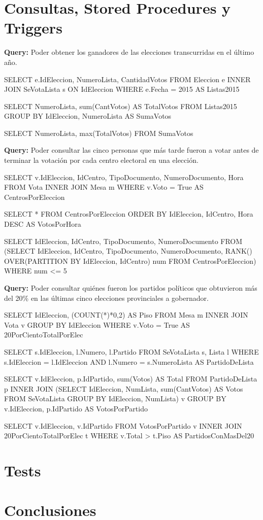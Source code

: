 \documentclass[10pt,a4paper]{article}
\begin{document}

\newpage
\section{Consultas, Stored Procedures y Triggers}

\textbf{Query:} Poder obtener los ganadores de las elecciones transcurridas en el último año.

SELECT e.IdEleccion, NumeroLista, CantidadVotos
FROM Eleccion e INNER JOIN SeVotaLista s
ON IdEleccion
WHERE e.Fecha = 2015 %
AS Listas2015

SELECT NumeroLista, sum(CantVotos) AS TotalVotos
FROM Listas2015
GROUP BY IdEleccion, NumeroLista
AS SumaVotos

SELECT NumeroLista, max(TotalVotos)
FROM SumaVotos

\textbf{Query:} Poder consultar las cinco personas que más tarde fueron a votar antes de terminar la votación por cada centro electoral en una elección.

SELECT v.IdEleccion, IdCentro, TipoDocumento, NumeroDocumento, Hora
FROM Vota INNER JOIN Mesa m
WHERE v.Voto = True
AS CentrosPorEleccion

SELECT * FROM CentrosPorEleccion
ORDER BY IdEleccion, IdCentro, Hora DESC
AS VotosPorHora

SELECT IdEleccion, IdCentro, TipoDocumento, NumeroDocumento
FROM (SELECT IdEleccion, IdCentro, TipoDocumento, NumeroDocumento, RANK() OVER(PARTITION BY IdEleccion, IdCentro)
num FROM CentrosPorEleccion)
WHERE num <= 5

\textbf{Query:} Poder consultar quiénes fueron los partidos políticos que obtuvieron más del 20\% en las últimas cinco elecciones provinciales a gobernador.

SELECT IdEleccion, (COUNT(*)*0,2) AS Piso
FROM Mesa m INNER JOIN Vota v
GROUP BY IdEleccion
WHERE v.Voto = True
AS 20PorCientoTotalPorElec

SELECT s.IdEleccion, l.Numero, l.Partido
FROM SeVotaLista s, Lista l
WHERE s.IdEleccion = l.IdEleccion AND l.Numero = s.NumeroLista
AS PartidoDeLista

SELECT v.IdEleccion, p.IdPartido, sum(Votos) AS Total
FROM PartidoDeLista p INNER JOIN
(SELECT IdEleccion, NumLista, sum(CantVotos) AS Votos
FROM SeVotaLista
GROUP BY IdEleccion, NumLista) v
GROUP BY v.IdEleccion, p.IdPartido
AS VotosPorPartido

SELECT v.IdEleccion, v.IdPartido
FROM VotosPorPartido v INNER JOIN 20PorCientoTotalPorElec t
WHERE v.Total > t.Piso
AS PartidosConMasDel20

\newpage
\section{Tests}

\newpage
\section{Conclusiones}
\end{document}

